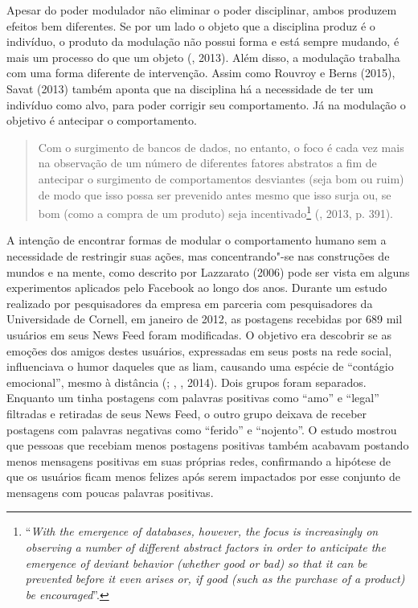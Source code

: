 Apesar do poder modulador não eliminar o poder disciplinar, ambos
produzem efeitos bem diferentes. Se por um lado o objeto que a
disciplina produz é o indivíduo, o produto da modulação não possui forma
e está sempre mudando, é mais um processo do que um objeto
(, 2013). Além disso, a modulação trabalha com uma forma diferente de
intervenção. Assim como Rouvroy e Berns (2015), Savat (2013) também
aponta que na disciplina há a necessidade de ter um indivíduo como alvo,
para poder corrigir seu comportamento. Já na modulação o objetivo é
antecipar o comportamento.

\begin{quote}
Com o surgimento de bancos de dados, no entanto, o foco é cada vez mais
na observação de um número de diferentes fatores abstratos a fim de
antecipar o surgimento de comportamentos desviantes (seja bom ou ruim)
de modo que isso possa ser prevenido antes mesmo que isso surja ou, se
bom (como a compra de um produto) seja incentivado\footnote{``\emph{With the
  emergence of databases, however, the focus is increasingly on
  observing a number of different abstract factors in order to
  anticipate the emergence of deviant behavior (whether good or bad) so
  that it can be prevented before it even arises or, if good (such as
  the purchase of a product) be encouraged}''.}
(, 2013, p. 391).
\end{quote}

A intenção de encontrar formas de modular o comportamento humano sem a
necessidade de restringir suas ações, mas concentrando"-se nas
construções de mundos e na mente, como descrito por Lazzarato (2006)
pode ser vista em alguns experimentos aplicados pelo Facebook ao longo
dos anos. Durante um estudo realizado por pesquisadores da empresa em
parceria com pesquisadores da Universidade de Cornell, em janeiro de
2012, as postagens recebidas por 689 mil usuários em seus News Feed
foram modificadas. O objetivo era descobrir se as emoções dos amigos
destes usuários, expressadas em seus posts na rede social, influenciava
o humor daqueles que as liam, causando uma espécie de ``contágio
emocional'', mesmo à distância (; , , 2014). Dois
grupos foram separados. Enquanto um tinha postagens com palavras
positivas como ``amo'' e ``legal'' filtradas e retiradas de seus News
Feed, o outro grupo deixava de receber postagens com palavras negativas
como ``ferido'' e ``nojento''. O estudo mostrou que pessoas que recebiam
menos postagens positivas também acabavam postando menos mensagens
positivas em suas próprias redes, confirmando a hipótese de que os
usuários ficam menos felizes após serem impactados por esse conjunto de
mensagens com poucas palavras positivas.

